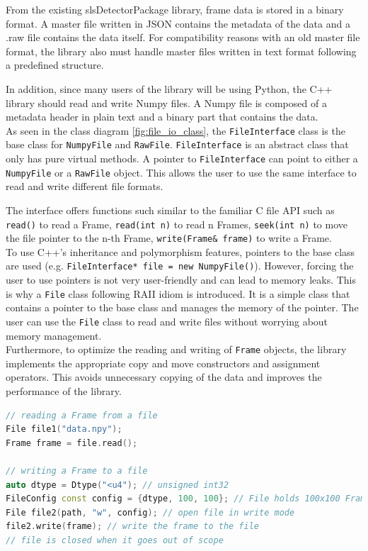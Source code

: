 \documentclass[./chapitre3.tex]{subfiles}
\begin{document}
From the existing slsDetectorPackage library, frame data is stored in a binary format.
A master file written in JSON contains the metadata of the data and a .raw file contains the data itself.
For compatibility reasons with an old master file format, the library also must handle master files written in text
format following a predefined structure.

In addition, since many users of the library will be using Python, the C++ library should
read and write Numpy files. A Numpy file is composed of a metadata header in plain text and
a binary part that contains the data.\\

As seen in the class diagram \ref{fig:file_io_class}, the \lstinline|FileInterface| class
is the base class for \lstinline|NumpyFile| and \lstinline|RawFile|. \lstinline|FileInterface|
is an abstract class that only has pure virtual methods. A pointer to \lstinline|FileInterface|
can point to either a \lstinline|NumpyFile| or a \lstinline|RawFile| object. This allows the
user to use the same interface to read and write different file formats.

The interface offers functions such similar to the familiar C file API such as \lstinline|read()|
to read a Frame, \lstinline|read(int n)| to read n Frames, \lstinline|seek(int n)| to move the
file pointer to the n-th Frame, \lstinline|write(Frame& frame)| to write a Frame.\\

To use C++'s inheritance and polymorphism features, pointers to the base class are used
(e.g. \lstinline|FileInterface* file = new NumpyFile()|). However, forcing the user to use
pointers is not very user-friendly and can lead to memory leaks. This is why a \lstinline|File|
class following RAII idiom is introduced. It is a simple class that contains a pointer to
the base class and manages the memory of the pointer. The user can use the \lstinline|File|
class to read and write files without worrying about memory management.\\

Furthermore, to optimize the reading and writing of \lstinline|Frame| objects, the
library implements the appropriate copy and move constructors and assignment operators.
This avoids unnecessary copying of the data and improves the performance of the library.\\

\begin{lstlisting}[language=C++, caption={Example: Reading and writing a Frame from a file},label={lst:read_frame}]
// reading a Frame from a file
File file1("data.npy");
Frame frame = file.read();

// writing a Frame to a file
auto dtype = Dtype("<u4"); // unsigned int32
FileConfig const config = {dtype, 100, 100}; // File holds 100x100 Frames of uint32_t
File file2(path, "w", config); // open file in write mode
file2.write(frame); // write the frame to the file
// file is closed when it goes out of scope
\end{lstlisting}
\end{document}
